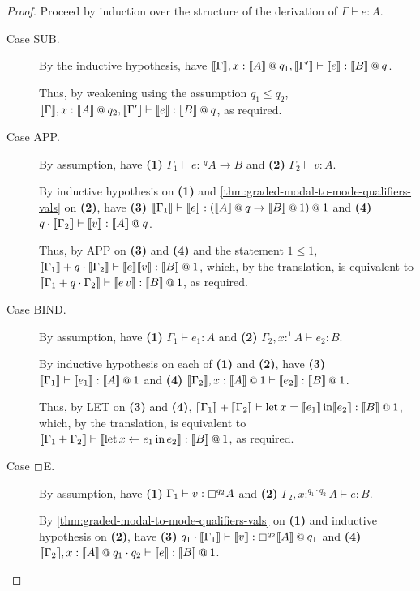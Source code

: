 \documentclass[acmsmall,screen,nonacm]{acmart}
\makeatletter
\DeclareMathOperator{\llet}{\text{let}}
\DeclareMathOperator{\lin}{\text{in}}
\newcommand{\at}{\mathbin{\mbox{\small\ensuremath{@}}}}
\newcommand{\tee}{\vdash}
\newcommand{\sem}[1]{\llbracket #1 \rrbracket}
\makeatother
\begin{document}
\begin{proof} 
  Proceed by induction over the structure of the derivation of $\Gamma \tee e : A$.
  \begin{description}
    \item[Case SUB.]
    By the inductive hypothesis, have $\sem{\Gamma}, x : \sem{A} \at q_1, \sem{\Gamma^\prime} \tee \sem{e} : \sem{B} \at q$. 
    
    Thus, by weakening using the assumption $q_1 \le q_2$, $\sem{\Gamma}, x : \sem{A} \at q_2, \sem{\Gamma^\prime} \tee \sem{e} : \sem{B} \at q$, as required.
    \\
    \item[Case APP.]
    By assumption, have \textbf{(1)} $\Gamma_1 \tee e : \,^qA \rightarrow B$ and \textbf{(2)} $\Gamma_2 \tee v : A$. 
    
    By inductive hypothesis on \textbf{(1)} and \ref{thm:graded-modal-to-mode-qualifiers-vals} on \textbf{(2)}, have \textbf{(3)} $\sem{\Gamma_1} \tee \sem{e} : (\sem{A} \at q \rightarrow \sem{B} \at 1) \at 1$ and \textbf{(4)} $q \cdot \sem{\Gamma_2} \tee \sem{v} : \sem{A} \at q$. 

    Thus, by APP on \textbf{(3)} and \textbf{(4)} and the statement $1 \le 1$, $\sem{\Gamma_1} + q \cdot \sem{\Gamma_2} \tee \sem{e} \sem{v} : \sem{B} \at 1$, which, by the translation, is equivalent to $\sem{\Gamma_1 + q \cdot \Gamma_2} \tee \sem{e \, v} : \sem{B} \at 1$, as required.
    \\
    \item[Case BIND.]
    By assumption, have \textbf{(1)} $\Gamma_1 \tee e_1 : A$ and \textbf{(2)} $\Gamma_2, x :^1 A \tee e_2 : B$. 
    
    By inductive hypothesis on each of \textbf{(1)} and \textbf{(2)}, have \textbf{(3)} $\sem{\Gamma_1} \tee \sem{e_1} : \sem{A} \at 1$ and \textbf{(4)} $\sem{\Gamma_2}, x : \sem{A} \at 1 \tee \sem{e_2} : \sem{B} \at 1$. 
    
    Thus, by LET on \textbf{(3)} and \textbf{(4)}, $\sem{\Gamma_1} + \sem{\Gamma_2} \tee \llet x = \sem{e_1} \lin \sem{e_2} : \sem{B} \at 1$, which, by the translation, is equivalent to $\sem{\Gamma_1 + \Gamma_2} \tee \sem{\llet x \leftarrow e_1 \lin e_2} : \sem{B} \at 1$, as required.
    \\
    \item[Case $\boxempty$E.]
    By assumption, have \textbf{(1)} $\Gamma_1 \tee v : \boxempty^{q_2} A$ and \textbf{(2)} $\Gamma_2, x :^{q_1 \cdot q_2} A \tee e : B$. 
    
    By \ref{thm:graded-modal-to-mode-qualifiers-vals} on \textbf{(1)} and inductive hypothesis on \textbf{(2)}, have \textbf{(3)} $q_1 \cdot \sem{\Gamma_1} \tee \sem{v} : \boxempty^{q_2} \sem{A} \at q_1$ and \textbf{(4)} $\sem{\Gamma_2}, x : \sem{A} \at q_1 \cdot q_2 \tee \sem{e} : \sem{B} \at 1$. 
    

\end{description}
\end{proof}
\end{document}
